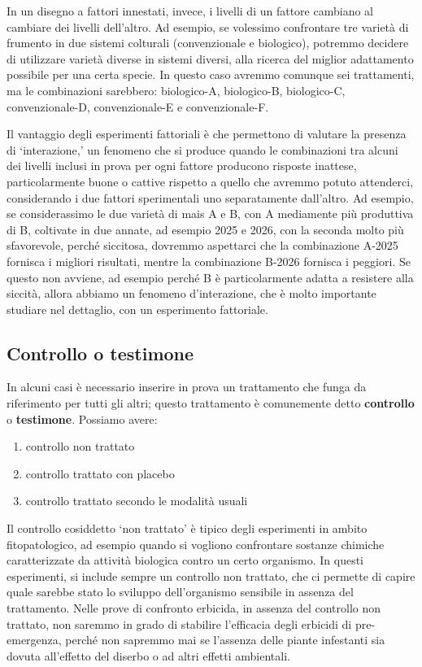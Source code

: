 \documentclass[a4paper,12pt,oneside]{book}
\providecommand{\tightlist}{%
  \setlength{\itemsep}{0pt}\setlength{\parskip}{0pt}}
\begin{document}
In un disegno a fattori innestati, invece, i livelli di un fattore cambiano al cambiare dei livelli dell'altro. Ad esempio, se volessimo confrontare tre varietà di frumento in due sistemi colturali (convenzionale e biologico), potremmo decidere di utilizzare varietà diverse in sistemi diversi, alla ricerca del miglior adattamento possibile per una certa specie. In questo caso avremmo comunque sei trattamenti, ma le combinazioni sarebbero: biologico-A, biologico-B, biologico-C, convenzionale-D, convenzionale-E e convenzionale-F.

Il vantaggio degli esperimenti fattoriali è che permettono di valutare la presenza di `interazione,' un fenomeno che si produce quando le combinazioni tra alcuni dei livelli inclusi in prova per ogni fattore producono risposte inattese, particolarmente buone o cattive rispetto a quello che avremmo potuto attenderci, considerando i due fattori sperimentali uno separatamente dall'altro. Ad esempio, se considerassimo le due varietà di mais A e B, con A mediamente più produttiva di B, coltivate in due annate, ad esempio 2025 e 2026, con la seconda molto più sfavorevole, perché siccitosa, dovremmo aspettarci che la combinazione A-2025 fornisca i migliori risultati, mentre la combinazione B-2026 fornisca i peggiori. Se questo non avviene, ad esempio perché B è particolarmente adatta a resistere alla siccità, allora abbiamo un fenomeno d'interazione, che è molto importante studiare nel dettaglio, con un esperimento fattoriale.

\hypertarget{controllo-o-testimone}{%
\subsection{Controllo o testimone}\label{controllo-o-testimone}}

In alcuni casi è necessario inserire in prova un trattamento che funga da riferimento per tutti gli altri; questo trattamento è comunemente detto \textbf{controllo} o \textbf{testimone}. Possiamo avere:

\begin{enumerate}
\def\labelenumi{\arabic{enumi}.}
\tightlist
\item
  controllo non trattato
\item
  controllo trattato con placebo
\item
  controllo trattato secondo le modalità usuali
\end{enumerate}

Il controllo cosiddetto `non trattato' è tipico degli esperimenti in ambito fitopatologico, ad esempio quando si vogliono confrontare sostanze chimiche caratterizzate da attività biologica contro un certo organismo. In questi esperimenti, si include sempre un controllo non trattato, che ci permette di capire quale sarebbe stato lo sviluppo dell'organismo sensibile in assenza del trattamento. Nelle prove di confronto erbicida, in assenza del controllo non trattato, non saremmo in grado di stabilire l'efficacia degli erbicidi di pre-emergenza, perché non sapremmo mai se l'assenza delle piante infestanti sia dovuta all'effetto del diserbo o ad altri effetti ambientali.
\end{document}
